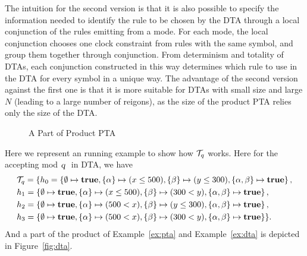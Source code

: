 The intuition for the second version is that it is also possible to specify the information needed to identify the rule to be chosen by the DTA through a local conjunction of the rules emitting from a mode.
For each mode, the local conjunction chooses one clock constraint from rules with the same symbol, and group them together through conjunction.
From determinism and totality of DTAs,
each conjunction constructed in this way determines which rule to use in the DTA for every symbol in a unique way.
The advantage of the second version against the first one is that it is more suitable for DTAs with small size and large $N$ (leading to a large number of reigons), as the size of the product PTA relies only the size of the DTA.

\begin{figure}
    \centering
    \resizebox{.5\textwidth}{!}{
        
        }
    \caption{A Part of Product PTA}
    \label{fig:product}  
\end{figure}

\begin{example}
Here we represent an running example to show how $\mathcal{T}_{q}$ works. 
Here for the accepting mod $\mbox{\sl q }$ in DTA, we have
\begin{align*}
    &
    \mathcal{T}_{q} 
        = \{ 
            h_0 = \left \{
                \emptyset           \mapsto \mathbf{true},
                \{ \alpha \}        \mapsto ( x \le 500 ),
                \{ \beta  \}        \mapsto ( y \le 300 ),
                \{ \alpha, \beta \}  \mapsto \mathbf{true}
            \right \}, 
            \\
            &
            h_1 = \left \{
                \emptyset           \mapsto \mathbf{true},
                \{ \alpha \}        \mapsto ( x \le 500 ),
                \{ \beta  \}        \mapsto ( 300 < y ),
                \{ \alpha, \beta \}  \mapsto \mathbf{true}
            \right \}, 
            \\
            &
            h_2 = \left \{
                \emptyset           \mapsto \mathbf{true},
                \{ \alpha \}        \mapsto ( 500 < x  ),
                \{ \beta  \}        \mapsto ( y \le 300 ),
                \{ \alpha, \beta \}  \mapsto \mathbf{true}
            \right \}, 
            \\
            &
            h_3 = \left \{
                \emptyset           \mapsto \mathbf{true},
                \{ \alpha \}        \mapsto ( 500 < x ),
                \{ \beta  \}        \mapsto ( 300 < y ),
                \{ \alpha, \beta \}  \mapsto \mathbf{true}
            \right \} 
        \} .
\end{align*}
And a part of the product of Example~\ref{ex:pta} and Example~\ref{ex:dta} is depicted in Figure~\ref{fig:dta}.
\end{example}


